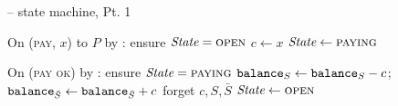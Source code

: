 \begin{figure}[H]
\begin{systembox}{\fchan{} -- state machine, Pt. 1}
\begin{algorithmic}[1]
      \State On (\textsc{pay}, $x$) to $P$ by \environment:
      \Indent
        \State ensure $\itistate = \textsc{open}$
        \State $c \gets x$
        \State $\itistate \gets \textsc{paying}$
      \EndIndent
      \Statex

      \State On (\textsc{pay ok}) by \adversary:
      \Indent
        \State ensure $\itistate = \textsc{paying}$
        \State $\texttt{balance}_{S} \gets \texttt{balance}_{S} - c$; $\texttt{balance}_{\bar{S}} \gets
        \texttt{balance}_{\bar{S}} + c$
        \State forget $c, S, \bar{S}$
        \State $\itistate \gets \textsc{open}$
      \EndIndent
    \end{algorithmic}
  \end{systembox}
  \caption{}
  \label{code:functionality:state-machine-1}
\end{figure}


